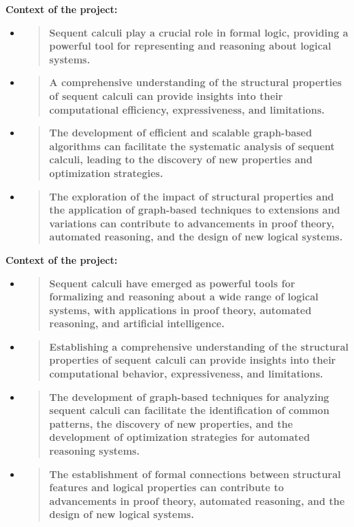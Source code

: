 \textbf{Context of the project:}

\begin{itemize}
\item
  \begin{quote}
  \textbf{Sequent calculi play a crucial role in formal logic, providing
  a powerful tool for representing and reasoning about logical systems.}
  \end{quote}
\item
  \begin{quote}
  \textbf{A comprehensive understanding of the structural properties of
  sequent calculi can provide insights into their computational
  efficiency, expressiveness, and limitations.}
  \end{quote}
\item
  \begin{quote}
  \textbf{The development of efficient and scalable graph-based
  algorithms can facilitate the systematic analysis of sequent calculi,
  leading to the discovery of new properties and optimization
  strategies.}
  \end{quote}
\item
  \begin{quote}
  \textbf{The exploration of the impact of structural properties and the
  application of graph-based techniques to extensions and variations can
  contribute to advancements in proof theory, automated reasoning, and
  the design of new logical systems.}
  \end{quote}
\end{itemize}

\textbf{Context of the project:}

\begin{itemize}
\item
  \begin{quote}
  \textbf{Sequent calculi have emerged as powerful tools for formalizing
  and reasoning about a wide range of logical systems, with applications
  in proof theory, automated reasoning, and artificial intelligence.}
  \end{quote}
\item
  \begin{quote}
  \textbf{Establishing a comprehensive understanding of the structural
  properties of sequent calculi can provide insights into their
  computational behavior, expressiveness, and limitations.}
  \end{quote}
\item
  \begin{quote}
  \textbf{The development of graph-based techniques for analyzing
  sequent calculi can facilitate the identification of common patterns,
  the discovery of new properties, and the development of optimization
  strategies for automated reasoning systems.}
  \end{quote}
\item
  \begin{quote}
  \textbf{The establishment of formal connections between structural
  features and logical properties can contribute to advancements in
  proof theory, automated reasoning, and the design of new logical
  systems.}
  \end{quote}
\end{itemize}

